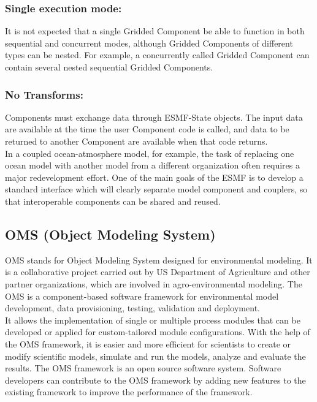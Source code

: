\subsubsection{Single execution mode:}
It is not expected that a single Gridded Component be able to function in both sequential and concurrent modes, although Gridded Components of different types can be nested. For example, a concurrently called Gridded Component can contain several nested sequential Gridded Components.
\subsubsection{No Transforms:}
Components must exchange data through ESMF-State objects. The input data are available at the time the user Component code is called, and data to be returned to another Component are available when that code returns.\\

In a coupled ocean-atmosphere model, for example, the task of replacing one ocean model with another model from a different organization often requires a major redevelopment effort. One of the main goals of the ESMF is to develop a standard interface which will clearly separate model component and couplers, so that interoperable components can be shared and reused.


\subsection{OMS (Object Modeling System)}
OMS stands for Object Modeling System designed for environmental modeling. It is a collaborative project carried out by US Department of Agriculture and other partner organizations, which are involved in agro-environmental modeling. The OMS is a component-based software framework for environmental model development, data provisioning, testing, validation and deployment.\\
It allows the implementation of single or multiple process modules that can be developed or applied for custom-tailored module configurations. With the help of the OMS framework, it is easier and more efficient for scientists to create or modify scientific models, simulate and run the models, analyze and evaluate the results. The OMS framework is an open source software system. Software developers can contribute to the OMS framework by adding new features to the existing framework to improve the performance of the framework.\\


